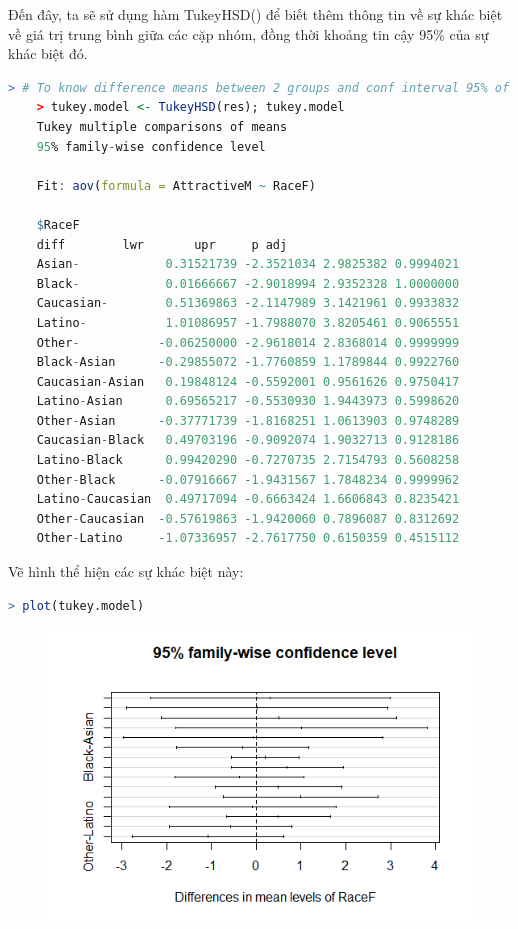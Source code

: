 \documentclass[a4paper,12pt]{article}
\begin{document}
	Đến đây, ta sẽ sử dụng hàm TukeyHSD() để biết thêm thông tin về sự khác biệt về giá trị trung bình giữa các cặp nhóm, đồng thời khoảng tin cậy 95\% của sự khác biệt đó.
	\begin{lstlisting}[language=R]
	> # To know difference means between 2 groups and conf interval 95% of if
	> tukey.model <- TukeyHSD(res); tukey.model
	Tukey multiple comparisons of means
	95% family-wise confidence level
	
	Fit: aov(formula = AttractiveM ~ RaceF)
	
	$RaceF
	diff        lwr       upr     p adj
	Asian-            0.31521739 -2.3521034 2.9825382 0.9994021
	Black-            0.01666667 -2.9018994 2.9352328 1.0000000
	Caucasian-        0.51369863 -2.1147989 3.1421961 0.9933832
	Latino-           1.01086957 -1.7988070 3.8205461 0.9065551
	Other-           -0.06250000 -2.9618014 2.8368014 0.9999999
	Black-Asian      -0.29855072 -1.7760859 1.1789844 0.9922760
	Caucasian-Asian   0.19848124 -0.5592001 0.9561626 0.9750417
	Latino-Asian      0.69565217 -0.5530930 1.9443973 0.5998620
	Other-Asian      -0.37771739 -1.8168251 1.0613903 0.9748289
	Caucasian-Black   0.49703196 -0.9092074 1.9032713 0.9128186
	Latino-Black      0.99420290 -0.7270735 2.7154793 0.5608258
	Other-Black      -0.07916667 -1.9431567 1.7848234 0.9999962
	Latino-Caucasian  0.49717094 -0.6663424 1.6606843 0.8235421
	Other-Caucasian  -0.57619863 -1.9420060 0.7896087 0.8312692
	Other-Latino     -1.07336957 -2.7617750 0.6150359 0.4515112
	\end{lstlisting}
	
	Vẽ hình thể hiện các sự khác biệt này:
	\begin{lstlisting}[language=R]
	> plot(tukey.model)
	\end{lstlisting}
	
	\begin{figure}[H]
		\centering
		\includegraphics[width=0.7\linewidth]{tukeyplot}
		\caption{}
		\label{fig:tukeyplot}
	\end{figure}
	
\end{document}
